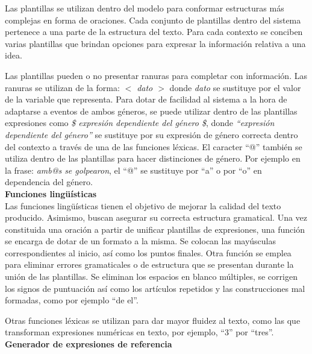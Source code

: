     Las plantillas se utilizan dentro del modelo para conformar estructuras más complejas en forma de oraciones. Cada conjunto 
de plantillas dentro del sistema pertenece a una parte de la estructura del texto. Para cada contexto se conciben varias plantillas que brindan opciones para expresar la información relativa a una idea.

    Las plantillas pueden o no presentar ranuras para completar con información. Las ranuras se utilizan de la forma: \textit{$<$ dato $>$} donde 
\textit{dato} se sustituye por el valor de la variable que representa. Para dotar de facilidad al sistema a la hora de adaptarse a eventos de 
ambos géneros, se puede utilizar dentro de las plantillas expresiones como \textit{\$ expresión dependiente del género \$}, donde \textit{“expresión dependiente del género” }
se sustituye por su expresión de género correcta dentro del contexto a través de una de las funciones léxicas. El caracter “@” también se utiliza dentro de las plantillas 
para hacer distinciones de género. Por ejemplo en la frase: \textit{amb@s se golpearon}, el “@” se sustituye por “a” o por “o” en dependencia del género.
\\

\textbf{Funciones lingüísticas}\\

    Las funciones lingüísticas tienen el objetivo de mejorar la calidad del texto producido. Asimismo, buscan asegurar su correcta estructura gramatical. Una vez constituida una oración a partir de unificar plantillas de expresiones, una función se encarga de dotar de un 
formato a la misma. Se colocan las mayúsculas correspondientes al inicio, así como los puntos finales. Otra función se emplea para eliminar errores gramaticales o de 
estructura que se presentan durante la unión de las plantillas. Se eliminan los espacios en blanco múltiples, se corrigen los signos de puntuación así como los artículos 
repetidos y las construcciones mal formadas, como por ejemplo “de el”.

Otras funciones léxicas se utilizan para dar mayor fluidez al texto, como las que transforman expresiones numéricas en texto, por ejemplo, “3” por “tres”.
\\

\textbf{Generador de expresiones de referencia}\\

